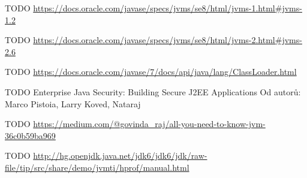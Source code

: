 \begin{literatura}{99}
    TODO \url{https://docs.oracle.com/javase/specs/jvms/se8/html/jvms-1.html#jvms-1.2}

    TODO \url{https://docs.oracle.com/javase/specs/jvms/se8/html/jvms-2.html#jvms-2.6}

    TODO \url{https://docs.oracle.com/javase/7/docs/api/java/lang/ClassLoader.html}

    TODO Enterprise Java Security: Building Secure J2EE Applications
    Od autorů: Marco Pistoia, Larry Koved, Nataraj 

    TODO \url{https://medium.com/@govinda_raj/all-you-need-to-know-jvm-36c0b59ba969}

    TODO \url{http://hg.openjdk.java.net/jdk6/jdk6/jdk/raw-file/tip/src/share/demo/jvmti/hprof/manual.html}

\end{literatura}